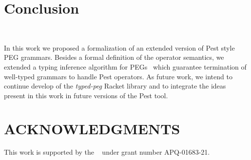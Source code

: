 \documentclass[sigplan,screen]{acmart}
\theoremstyle{definition}
\begin{document}
\section{Conclusion}~\label{sec:conclusion}

In this work we proposed a formalization of an extended version of Pest style PEG
grammars. %
Besides a formal definition of the operator semantics, we
extended a typing inference algorithm for PEGs~\cite{Cardoso23} which guarantee
termination of well-typed grammars to handle Pest operators.
As future work, we
intend to continue develop of the \emph{typed-peg} Racket library and to
integrate the ideas present in this work in future versions of the Pest tool.



\section*{ACKNOWLEDGMENTS}
This work is supported by the ~
under grant number APQ-01683-21.




\end{document}
